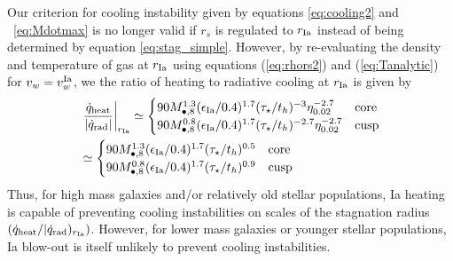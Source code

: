 \documentclass[usenatbib,fleqn]{mn2e}
\newcommand{\rs}{r_s}
\newcommand{\Mbheight}{M_{\bullet,8}}
\newcommand{\rIa}{r_{\rm Ia}}
\renewcommand{\th}{t_h}
\begin{document}
Our criterion for cooling instability given by equations \eqref{eq:cooling2} and ~\eqref{eq:Mdotmax} is no longer valid if $\rs$ is regulated to $\rIa$ instead of being determined by equation \eqref{eq:stag_simple}.  However, by re-evaluating the density and temperature of gas at $\rIa$ using equations  (\ref{eq:rhors2}) and (\ref{eq:Tanalytic}) for $v_w = v_{w}^{\rm Ia}$, we the ratio of heating to radiative cooling at $\rIa$ is given by
\begin{align}
\label{eq:heatingratioIa}
&\left.\frac{\dot{q}_{\rm heat}}{\left|\dot{q}_{\rm rad}\right|}\right|_{\rIa}\simeq
\begin{cases}
  90 \Mbheight^{1.3} (\epsilon_{\rm Ia}/0.4)^{1.7} (\tau_{\star}/\th)^{-3}
  \eta_{0.02}^{-2.7} & \text{core}\nonumber\\
   90 \Mbheight^{0.8} (\epsilon_{\rm Ia}/0.4)^{1.7} (\tau_{\star}/\th)^{-2.7}
  \eta_{0.02}^{-2.7} & \text{cusp}\nonumber\\
\end{cases}\\&\simeq
\begin{cases}
  90 \Mbheight^{1.3} (\epsilon_{\rm Ia}/0.4)^{1.7}
  (\tau_{\star}/\th)^{0.5}
 & \text{core}\\
   90 \Mbheight^{0.8} (\epsilon_{\rm Ia}/0.4)^{1.7} (\tau_{\star}/\th)^{0.9}
  & \text{cusp}\\
\end{cases}
\end{align}
Thus, for high mass galaxies and/or relatively old stellar populations, Ia heating is capable of preventing cooling instabilities on scales of the stagnation radius $(\dot{q}_{\rm heat}/|\dot{q}_{\rm rad})_{\rIa})$. However, for lower mass galaxies or younger stellar populations, Ia blow-out is itself unlikely to prevent cooling instabilities.


\end{document}
